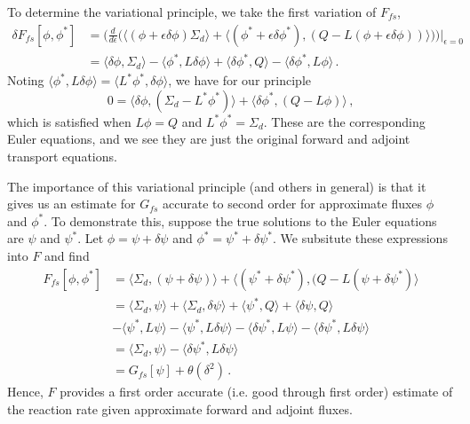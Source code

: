 To determine the variational principle, we take the first variation of $F_{fs}$,
\begin{equation}
 \begin{split}
  \delta F_{fs} [\phi,\phi^*] &= \Bigg ( \frac{d}{d\epsilon} \Big ( \langle (\phi+\epsilon \delta \phi) \Sigma_d \rangle + \langle (\phi^* + \epsilon \delta \phi^*), (Q-L(\phi+\epsilon \delta \phi)) \rangle \Big ) \Bigg ) \Bigg|_{\epsilon=0} \\
   &= \langle \delta \phi, \Sigma_d \rangle - \langle \phi^*,L \delta \phi \rangle + \langle \delta \phi^*, Q \rangle - \langle \delta \phi^*, L \phi \rangle \, .
 \end{split}
\end{equation}
Noting $\langle \phi^*,L\delta \phi \rangle = \langle L^* \phi^*,\delta \phi \rangle$, we have for our principle 
\begin{equation}
 0 = \langle \delta \phi, (\Sigma_d - L^* \phi^*) \rangle + \langle \delta \phi^*, (Q-L\phi) \rangle \, ,
\end{equation}
which is satisfied when $L\phi = Q$ and $L^* \phi^* = \Sigma_d$.  These are the corresponding Euler equations, and we see they are just the original forward and adjoint transport equations.

The importance of this variational principle (and others in general) is that it gives us an estimate for $G_{fs}$ accurate to second order for approximate fluxes $\phi$ and $\phi^*$.  To demonstrate this, suppose the true solutions to the Euler equations are $\psi$ and $\psi^*$.  Let $\phi = \psi + \delta \psi$ and $\phi^* = \psi^* + \delta \psi^*$.  We subsitute these expressions into $F$ and find
\begin{equation}
 \begin{split}
    F_{fs} [\phi,\phi^*] &= \langle \Sigma_d, (\psi+\delta \psi) \rangle + \langle (\psi^*+\delta \psi^*),(Q-L(\psi+\delta \psi^*) \rangle \\
    &= \langle \Sigma_d,\psi \rangle + \langle \Sigma_d, \delta \psi \rangle + \langle \psi^*,Q \rangle + \langle \delta \psi,Q \rangle  \\ 
    &- \langle \psi^*, L\psi \rangle - \langle \psi^*, L\delta \psi \rangle - \langle \delta \psi^*, L\psi \rangle - \langle \delta \psi^*, L\delta \psi \rangle \\
    &= \langle \Sigma_d, \psi \rangle - \langle \delta \psi^*, L\delta \psi \rangle \\
    &= G_{fs}[\psi] + \theta(\delta^2) \, .
 \end{split}
 \label{eq:secondorderfs}
\end{equation}
Hence, $F$ provides a first order accurate (i.e. good through first order) estimate of the reaction rate given approximate forward and adjoint fluxes.

